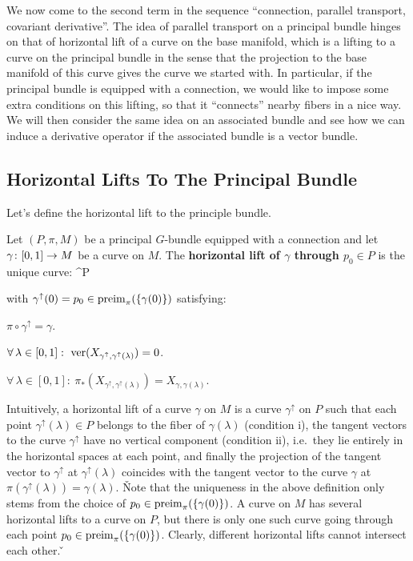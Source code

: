 We now come to the second term in the sequence ``connection, parallel transport, covariant derivative''. The idea of
parallel transport on a principal bundle hinges on that of horizontal lift of a curve on the base manifold, which is
a lifting to a curve on the principal bundle in the sense that the projection to the base manifold of this curve
gives the curve we started with. In particular, if the principal bundle is equipped with a connection, we would like
to impose some extra conditions on this lifting, so that it ``connects'' nearby fibers in a nice way. We will then
consider the same idea on an associated bundle and see how we can induce a derivative operator if the associated
bundle is a vector bundle.

\subsection{Horizontal Lifts To The Principal Bundle}

Let's define the horizontal lift to the principle bundle.

Let $(P,\pi,M)$ be a principal $G$-bundle equipped with a connection and let $\gamma\colon[0,1]\to M$ be a curve on $M$.
The \textbf{horizontal lift of $\gamma$ through $p_0\in P$} is the unique curve:
\bse
\gamma^{\uparrow}\cl [0,1] \to P
\ese

with $\gamma^\uparrow(0)=p_0\in \operatorname{preim}_\pi(\{\gamma(0)\})$ satisfying:
\ben[label=\roman*)]
\item $\pi \circ \gamma^{\uparrow} = \gamma$.
\item $\forall \, \lambda\in [0,1] : \ \ver(X_{\gamma^{\uparrow}, \gamma^{\uparrow}(\lambda)})=0$.
\item $\forall \, \lambda\in [0,1] : \ \pi_*(X_{\gamma^{\uparrow}, \gamma^{\uparrow}(\lambda)})=X_{\gamma,\gamma (\lambda)}$.
\een
\ed

Intuitively, a horizontal lift of a curve $\gamma$ on $M$ is a curve $\gamma^\uparrow$ on $P$ such that each point
$\gamma^\uparrow(\lambda)\in P$ belongs to the fiber of $\gamma(\lambda)$ (condition i), the tangent vectors to the
curve $\gamma^\uparrow$ have no vertical component (condition ii), i.e.\ they lie entirely in the horizontal spaces
at each point, and finally the projection of the tangent vector to $\gamma^\uparrow$ at $\gamma^\uparrow(\lambda)$
coincides with the tangent vector to the curve $\gamma$ at $\pi (\gamma^\uparrow(\lambda))=\gamma(\lambda)$. \v

Note that the uniqueness in the above definition only stems from the choice of $p_0\in\operatorname{preim}_\pi(\{\gamma(0)\})$. A
curve on $M$ has several horizontal lifts to a curve on $P$, but there is only one such curve going through each
point $p_0\in\operatorname{preim}_\pi(\{\gamma(0)\})$. Clearly, different horizontal lifts cannot intersect each other. \v

